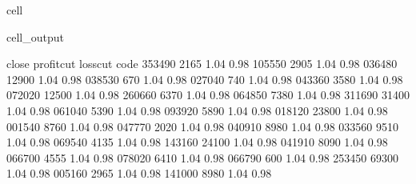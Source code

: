 \documentclass[letterpaper,10pt,english]{jupyterBook}
\begin{document}
\begin{sphinxuseclass}{cell}
\begin{sphinxVerbatimOutput}
\begin{sphinxuseclass}{cell_output}
\begin{sphinxVerbatim}[commandchars=\\\{\}]
        close  profit\PYGZus{}cut  loss\PYGZus{}cut  
code                                 
353490   2165        1.04      0.98  
105550   2905        1.04      0.98  
036480  12900        1.04      0.98  
038530    670        1.04      0.98  
027040    740        1.04      0.98  
043360   3580        1.04      0.98  
072020  12500        1.04      0.98  
260660   6370        1.04      0.98  
064850   7380        1.04      0.98  
311690  31400        1.04      0.98  
061040   5390        1.04      0.98  
093920   5890        1.04      0.98  
018120  23800        1.04      0.98  
001540   8760        1.04      0.98  
047770   2020        1.04      0.98  
040910   8980        1.04      0.98  
033560   9510        1.04      0.98  
069540   4135        1.04      0.98  
143160  24100        1.04      0.98  
041910   8090        1.04      0.98  
066700   4555        1.04      0.98  
078020   6410        1.04      0.98  
066790    600        1.04      0.98  
253450  69300        1.04      0.98  
005160   2965        1.04      0.98  
141000   8980        1.04      0.98  
\end{sphinxVerbatim}

\end{sphinxuseclass}\end{sphinxVerbatimOutput}

\end{sphinxuseclass}






\renewcommand{\indexname}{Index}
\printindex
\end{document}
